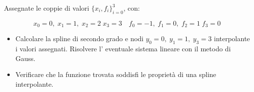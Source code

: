 Assegnate le coppie di valori $\{x_i,f_i \}_{i=0}^3$, con:

$$x_0=0, \; x_1=1, \; x_2=2  \; x_3=3 \quad f_0=-1, \; f_1=0, \; f_2=1  \; f_3=0$$

\begin{itemize}
\item Calcolare la spline di secondo grado e nodi
$y_0=0, \; y_1=1, \; y_3=3$ interpolante i valori assegnati.
Risolvere l' eventuale sistema lineare con il metodo di Gauss.
\item Verificare che la funzione trovata soddisfi le propriet\`a
di una spline interpolante.

\end{itemize}
